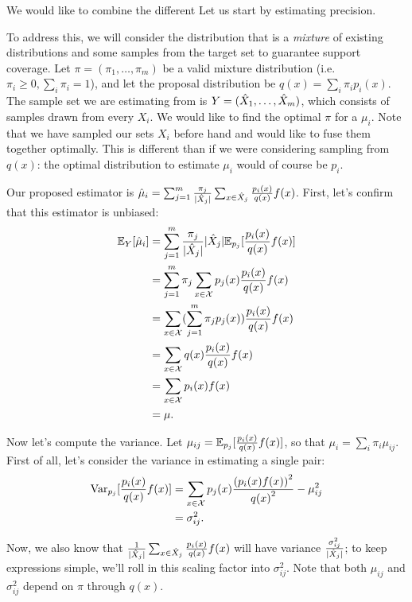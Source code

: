 We would like to combine the different 
Let us start by estimating precision.

To address this, we will consider the distribution that is a \textit{mixture} of existing distributions and some samples from the target set to guarantee support coverage.
Let $\pi = (\pi_1, \ldots, \pi_m)$ be a valid mixture distribution (i.e. $\pi_i \ge 0, \sum_{i} \pi_i = 1$),
and let the proposal distribution be $q(x) = \sum_i \pi_i p_i(x)$.
The sample set we are estimating from is $Y = ({\hat{X}}_1, \ldots, {\hat{X}}_m)$, which consists of samples drawn from every $X_i$.
We would like to find the optimal $\pi$ for a $\mu_i$.
Note that we have sampled our sets $X_i$ before hand and would like to fuse them together optimally.
This is different than if we were considering sampling from $q(x)$: the optimal distribution to estimate $\mu_i$ would of course be $p_i$.

Our proposed estimator is ${\hat{\mu}}_i = \sum_{j=1}^m \frac{\pi_j}{|{\hat{X}}_j|} \sum_{x \in {\hat{X}}_j} \frac{p_i(x)}{q(x)} f(x)$.
First, let's confirm that this estimator is unbiased:
\begin{align*}
  \mathbb{E}_{Y}[{\hat{\mu}}_i] 
  &= \sum_{j=1}^m \frac{\pi_j}{|{\hat{X}}_j|} |{\hat{X}}_j| \mathbb{E}_{p_j}[\frac{p_i(x)}{q(x)} f(x)] \\
  &= \sum_{j=1}^m \pi_j \sum_{x \in \mathcal{X}} p_j(x) \frac{p_i(x)}{q(x)} f(x) \\
  &= \sum_{x \in \mathcal{X}} (\sum_{j=1}^m \pi_j p_j(x)) \frac{p_i(x)}{q(x)} f(x) \\
  &= \sum_{x \in \mathcal{X}} q(x) \frac{p_i(x)}{q(x)} f(x) \\
  &= \sum_{x \in \mathcal{X}} p_i(x) f(x) \\
  &= \mu.
\end{align*}

Now let's compute the variance.
Let  $\mu_{ij} = \mathbb{E}_{p_j}[\frac{p_i(x)}{q(x)} f(x)]$, so that $\mu_i = \sum_i \pi_i \mu_{ij}$.
First of all, let's consider the variance in estimating a single pair: 
\begin{align*}
  \operatorname{Var}_{p_j}[\frac{p_i(x)}{q(x)} f(x)]
  &= \sum_{x \in \mathcal{X}} p_j(x) \frac{{(p_i(x) f(x))}^2}{{q(x)}^2} - \mu_{ij}^2 \\
  &= \sigma_{ij}^2.
\end{align*}

Now, we also know that $\frac{1}{|{\hat{X}}_j|} \sum_{x \in {\hat{X}}_j} \frac{p_i(x)}{q(x)} f(x)$ will have variance $\frac{\sigma_{ij}^2}{|{\hat{X}}_j|}$; to keep expressions simple, we'll roll in this scaling factor into $\sigma_{ij}^2$.
Note that both $\mu_{ij}$ and $\sigma_{ij}^2$ depend on $\pi$ through $q(x)$.

